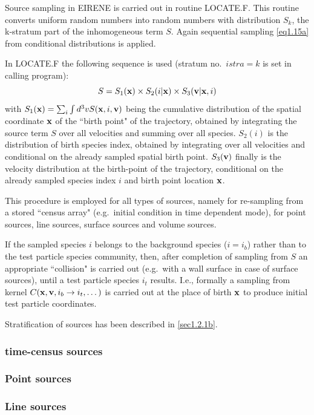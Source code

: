 Source sampling in EIRENE is carried out in routine LOCATE.F.
This routine converts uniform random numbers into random numbers with
distribution $S_k$, the k-stratum part of the inhomogeneous term $S$.
Again sequential sampling \cref{eq1.15a} from conditional distributions is
applied.

In LOCATE.F the following sequence is used (stratum no.\ $istra=k$ is set in
calling program):
\begin{equation}
  S = S_1(\mathbf{x}) \times S_2(i|\mathbf{x}) \times S_3(\mathbf{v}|\mathbf{x},i)
\end{equation}
with
$S_1(\mathbf{x})= \sum_i\int d^3v S(\mathbf{x},i,\mathbf{v})$ being the cumulative distribution of
the spatial coordinate $\mathbf{x}$ of the ``birth point" of the trajectory, obtained
by integrating the source term	$S$ over all velocities and summing over all
species.
$S_2(i)$ is the distribution of birth species index, obtained by integrating
over all velocities and conditional on the already sampled spatial birth point.
$S_3(\mathbf{v})$ finally is the velocity distribution at the birth-point of the
trajectory, conditional on the already sampled species index $i$ and birth
point location $\mathbf{x}$.

This procedure is employed for all types of sources, namely for re-sampling
from a stored ``census array" (e.g.\ initial condition in time dependent mode),
for point sources, line sources, surface sources and volume sources.

If the sampled species $i$ belongs to the background species ($i=i_b$) rather
than to the test particle species community, then, after completion of sampling
from $S$ an appropriate ``collision" is carried out (e.g.\ with a wall surface
in case of surface sources), until a test particle species $i_t$ results.
I.e., formally a sampling from	kernel $C(\mathbf{x},\mathbf{v},i_b \rightarrow i_t, \dots)$
is carried out at the place of birth $\mathbf{x}$ to produce initial test particle
coordinates.

Stratification of sources has been described in \cref{sec1.2.1b}.

\subsubsection{time-census sources}

\subsubsection{Point sources}

\subsubsection{Line sources}

